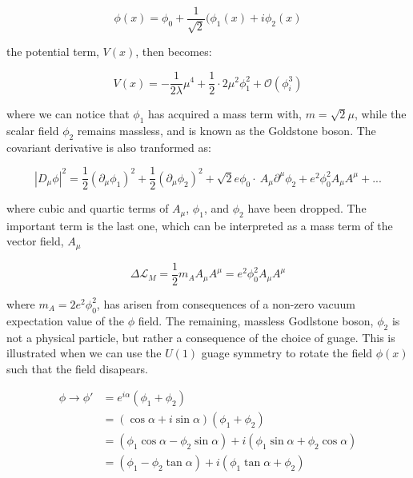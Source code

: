 \begin{equation}\label{eq:abelian_higgs_mechanism_expanded_phi}
\phi(x) = \phi_{0} + \frac{1}{\sqrt{2}}(\phi_{1}(x) + i\phi_{2}(x)
\end{equation}

\noindent the potential term, $V(x)$, then becomes:

\begin{equation}\label{eq:abelian_higgs_mechanism_expanded_pot}
V(x) = -\frac{1}{2\lambda}\mu^{4} +
\frac{1}{2}\cdot2\mu^{2}\phi_{1}^{2} + \mathcal{O}(\phi_{i}^{3})
\end{equation}

\noindent where we can notice that $\phi_{1}$ has acquired a mass term
with, $m = \sqrt{2}\mu$, while the scalar field $\phi_{2}$ remains
massless, and is known as the Goldstone boson.  The covariant
derivative is also tranformed as:

\begin{equation}\label{eq:abelian_higgs_mechanism_expanded_covDer}
|D_{\mu}\phi|^{2} = \frac{1}{2}(\partial_{\mu}\phi_{1})^{2} +
\frac{1}{2}(\partial_{\mu}\phi_{2})^{2} +
\sqrt{2}e\phi_{0}\cdot~A_{\mu}\partial^{\mu}\phi_{2} +
e^{2}\phi_{0}^{2}A_{\mu}A^{\mu} + ...
\end{equation}

\noindent where cubic and quartic terms of $A_{\mu}$, $\phi_{1}$,
and $\phi_{2}$ have been dropped.  The important term is the last one,
which can be interpreted as a mass term of the vector field, $A_{\mu}$

\begin{equation}\label{eq:abelian_higgs_mechanism_mass_term_Amu}
\Delta\mathcal{L}_{M} =
  \frac{1}{2}m_{A}A_{\mu}A^{\mu} = e^{2}\phi_{0}^{2}A_{\mu}A^{\mu}
\end{equation}

\noindent where $m_{A} = 2e^{2}\phi_{0}^{2}$, has arisen from
consequences of a non-zero vacuum expectation value of the $\phi$
field.  The remaining, massless Godlstone boson, $\phi_{2}$ is not a
physical particle, but rather a consequence of the choice of guage.
This is illustrated when we can use the $U(1)$ guage symmetry to rotate
the field $\phi(x)$ such that the field disapears.  

\begin{equation}\label{eq:abelian_higgs_mechanism_rotate_phi2}
\begin{aligned}
 \phi \rightarrow \phi' & = e^{i\alpha}(\phi_{1} + \phi_{2}) \\
& = (\cos{\alpha} + i\sin{\alpha})(\phi_{1} + \phi_{2}) \\
& = (\phi_{1}\cos{\alpha} - \phi_{2}\sin{\alpha}) +
i(\phi_{1}\sin{\alpha} + \phi_{2}\cos{\alpha}) \\
& = (\phi_{1} - \phi_{2}\tan{\alpha}) + i(\phi_{1}\tan{\alpha} +
\phi_{2})
\end{aligned}
\end{equation}

